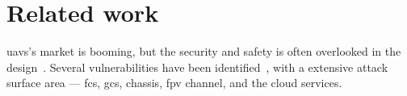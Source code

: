 
\section{Related work}%
\label{sec:related-work}
\glspl{uav}'s market is booming, but the security and safety is often overlooked
in the design~\cite{ferrao2020stuart}. Several vulnerabilities have been
identified~\cite{kishnaCyberVulnerUAVReview2017,nassi2021sok,mohsan2022towards},
with a extensive attack surface area --- \gls{fcs}, \gls{gcs}, chassis, \gls{fpv}
channel, and the cloud services.

